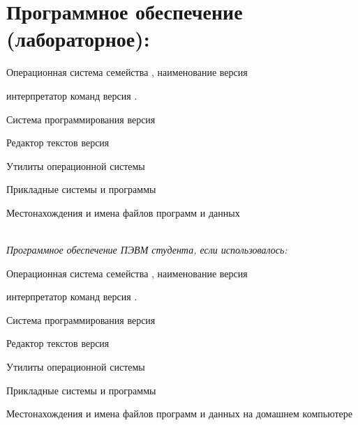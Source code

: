 \section{Программное обеспечение (лабораторное):}

Операционная система семейства \uline{\hspace{2cm}}, наименование \uline{\hspace{3cm}} версия \uline{\hfill}

интерпретатор команд \uline{\hspace{3cm}} версия \uline{\hspace{2cm}}.

Система программирования \uline{\hspace{8.25cm}} версия  \uline{\hfill}

Редактор текстов \uline{\hspace{9.9cm}} версия  \uline{\hfill}

Утилиты операционной системы \uline{\hfill}

\uline{\hfill}

Прикладные системы и программы \uline{\hfill}

Местонахождения и имена файлов программ и данных \uline{\hfill}

\uline{\hfill}\\

\textit{Программное обеспечение ПЭВМ студента, если использовалось:}

Операционная система семейства \uline{\hspace{2cm}}, наименование \uline{\hspace{3cm}} версия \uline{\hfill}

интерпретатор команд \uline{\hspace{3cm}} версия \uline{\hspace{2cm}}.

Система программирования \uline{\hspace{8.25cm}} версия  \uline{\hfill}

Редактор текстов \uline{\hspace{9.9cm}} версия  \uline{\hfill}

Утилиты операционной системы \uline{\hfill}

\uline{\hfill}

Прикладные системы и программы \uline{\hfill}

Местонахождения и имена файлов программ и данных на домашнем компьютере \uline{\hfill}

\uline{\hfill}

\newpage